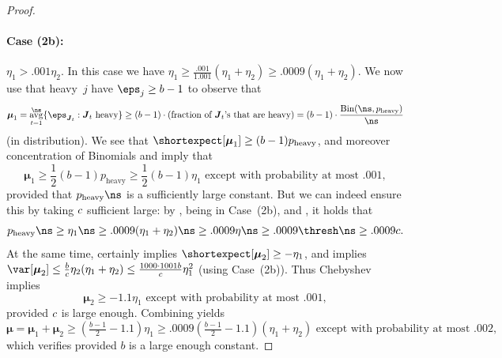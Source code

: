 \documentclass[11pt]{article}
\DeclareMathOperator*{\avg}{avg}
\newcommand{\E}{\shortexpect}
\newcommand{\bJ}{\boldsymbol{J}}
\newcommand{\bmu}{\boldsymbol{\mu}}
\begin{document}
\begin{proof}
	\paragraph{Case (2b):} $\eta_1 > .001\eta_2$.  \quad In this case we have $\eta_1 \geq \frac{.001}{1.001} (\eta_1+\eta_2) \geq .0009(\eta_1+\eta_2)$.  
	We now use that heavy~$j$ have $\eps_j \geq b-1$ to observe that
	\begin{equation}
		\bmu_1 = \avg_{t=1}^{\ns}\{\eps_{\bJ_t} : \bJ_t \text{ heavy}\} \geq (b-1) \cdot (\text{fraction of } \bJ_t\text{'s that are heavy}) =  (b-1) \cdot \frac{\text{Bin}(\ns, p_{\text{heavy}})}{\ns}
	\end{equation}
    (in distribution).
	We see that $\E[\bmu_1] \geq (b-1)p_{\text{heavy}}$, and moreover concentration of Binomials and  imply that 
	\begin{equation} \label{ineq:crunch1}
		\bmu_1\geq \frac12(b-1)p_{\text{heavy}} \geq \frac12(b-1)\eta_1 \text{ except with probability at most $.001$},	
	\end{equation}
	provided that $p_{\text{heavy}} \ns$ is a sufficiently large constant.
	But we can indeed ensure this by taking $c$ sufficient large: by ,  being in Case~(2b), and , it holds that
	\begin{equation}
		p_{\text{heavy}} \ns \geq \eta_1 \ns \geq .0009(\eta_1+\eta_2) \ns \geq .0009 \eta \ns \geq .0009\thresh \ns \geq .0009\cc.
	\end{equation}
	At the same time,  certainly implies $\E[\bmu_2] \geq -\eta_1$, and  implies $\var[\bmu_2] \leq \frac{b}{\cc} \eta_2 (\eta_1+\eta_2) \leq \frac{1000\cdot 1001 b}{\cc} \eta_1^2$ (using Case~(2b)).
	Thus Chebyshev implies 
	\begin{equation} \label{ineq:crunch2}
		\bmu_2 \geq -1.1\eta_1 \text{ except with probability at most~$.001$},
	\end{equation}
	provided $c$ is large enough.	
	Combining  yields
	\begin{equation}
		\bmu = \bmu_1 + \bmu_2 \geq (\tfrac{b-1}{2}-1.1)\eta_1 \geq .0009(\tfrac{b-1}{2}-1.1)(\eta_1+\eta_2) \text{ except with probability at most~$.002$},
	\end{equation}
	which verifies  provided $b$ is a large enough constant.

	\bigskip


\end{proof}
\end{document}
